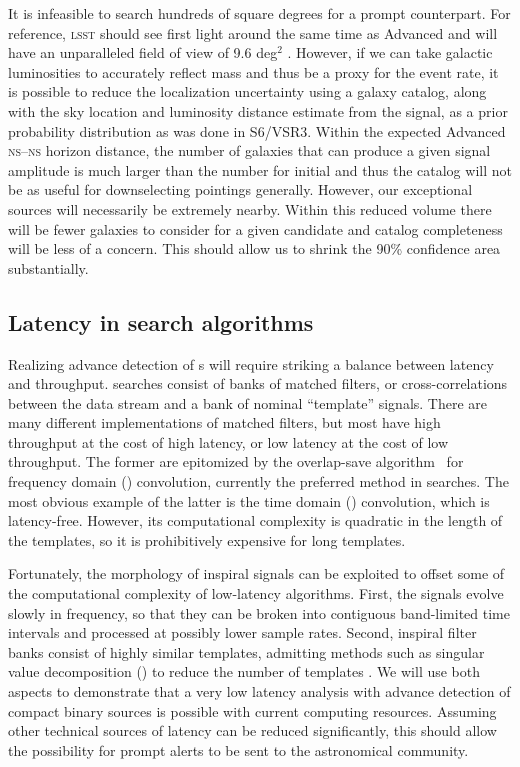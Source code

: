 It is infeasible to search hundreds of square degrees for a prompt
counterpart. For
reference, \textsc{lsst} should see first light around the same time as
Advanced \LIGO{} and will have an unparalleled field of view of 9.6 deg$^2$
\citep{2008arXiv0805.2366I}.  However, if we can take galactic luminosities
to accurately reflect mass and thus be a proxy for the \CBC{} event rate, it is
possible to reduce the localization uncertainty using a galaxy catalog, along
with the sky location and luminosity distance estimate from the \GW{} signal,
as a prior probability distribution \citep{galaxy-catalog} as was done in
S6/VSR3. Within the expected Advanced \LIGO{} \textsc{ns}--\textsc{ns} horizon
distance, the number of galaxies that can produce a given signal
amplitude is much larger than the number for initial \LIGO{} and thus the
catalog will not be as useful for downselecting pointings generally. However,
our exceptional sources will necessarily be extremely nearby. Within this
reduced volume there will be fewer galaxies to consider for a given
candidate and catalog completeness will be less of a concern.
This should allow us to shrink the 90\% confidence area substantially.

\subsection{Latency in \CBC{} search algorithms}

Realizing advance detection of \CBC{}s will
require striking a balance between latency and throughput. \CBC{} searches
consist of banks of matched filters, or
cross-correlations between the data stream and a bank of nominal ``template''
signals.  There are many different implementations of matched filters, but most
have high throughput at the cost of high latency, or low latency at the cost of
low throughput.  The former are epitomized by the overlap-save algorithm~%
\citep{numerical-recipes-chapter-13} for frequency domain (\FD) convolution,
currently the preferred method in \GW{}
searches.  The most obvious example of the latter is the time domain
(\TD) convolution, which is latency-free.  However, its
computational complexity is quadratic in the length of the templates, so it is
prohibitively expensive for long templates.

Fortunately, the morphology of inspiral signals can be exploited to offset some
of the computational complexity of low-latency algorithms.  First, the signals
evolve slowly in frequency, so that they can be broken into contiguous
band-limited time intervals and processed at possibly lower sample rates.
Second, inspiral filter banks consist of highly similar templates, admitting
methods such as singular value decomposition (\SVD{}) to reduce the number of
templates \citep{Cannon:2010p10398}. We will use both aspects to demonstrate that a very
low latency analysis with advance detection of compact binary sources is
possible with current computing resources.  Assuming other technical sources of
latency can be reduced significantly, this should allow the possibility for
prompt alerts to be sent to the astronomical community.

